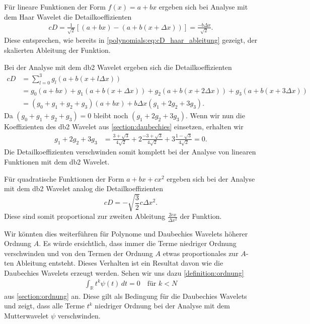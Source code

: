 \begin{refsection}
Für lineare Funktionen der Form $f(x) = a + b x$ ergeben sich bei Analyse mit
dem Haar Wavelet die Detailkoeffizienten
\begin{align*}
    cD = \frac{1}{\sqrt{2}} [ (a + b x) - (a + b (x + \Delta x)) ]
    = \frac{- b \Delta x}{\sqrt{2}}.
\end{align*}
Diese entsprechen, wie bereits in \cref{polynomials:eq:cD_haar_ableitung}
gezeigt, der skalierten Ableitung der Funktion.

Bei der Analyse mit dem db2 Wavelet ergeben sich die Detailkoeffizienten
\begin{align*}
    cD &= \sum_{l=0}^{3} g_l (a + b (x + l\Delta x)) \\
       &= g_0 (a + b x) + g_1 (a + b (x + \Delta x)) + g_2 (a + b (x + 2 \Delta x)) + g_3 (a + b (x + 3 \Delta x)) \\
       &= (g_0 + g_1 + g_2 + g_3) (a + bx) + b \Delta x (g_1 + 2 g_2 + 3 g_3).
\end{align*}
Da $(g_0 + g_1 + g_2 + g_3) = 0$ bleibt noch $(g_1 + 2 g_2 + 3 g_3)$. Wenn wir
nun die Koeffizienten des db2 Wavelet aus \cref{section:daubechies} einsetzen,
erhalten wir
\begin{align*}
    g_1 + 2 g_2 + 3 g_3 &= \frac{3 + \sqrt{3}}{4\sqrt{2}} + 2 \frac{-3 + \sqrt{3}}{4\sqrt{2}} + 3 \frac{1 - \sqrt{3}}{4\sqrt{2}} = 0.
\end{align*}
Die Detailkoeffizienten verschwinden somit komplett bei der Analyse von
linearen Funktionen mit dem db2 Wavelet.

Für quadratische Funktionen der Form $a + bx + cx^2$ ergeben sich bei der
Analyse mit dem db2 Wavelet analog die Detailkoeffizienten \[cD =
-\sqrt{\frac{3}{2}} c \Delta x^2.\] Diese sind somit proportional zur zweiten
Ableitung $\frac{2c x}{\Delta x^2}$ der Funktion.

Wir könnten dies weiterführen für Polynome und Daubechies Wavelets höherer
Ordnung $A$. Es würde ersichtlich, dass immer die Terme niedriger Ordnung
verschwinden und von den Termen der Ordnung $A$ etwas proportionales zur
$A$-ten Ableitung entsteht. Dieses Verhalten ist ein Resultat davon wie die
Daubechies Wavelets erzeugt werden. Sehen wir uns dazu
\cref{definition:ordnung}
\begin{align*}
    \int_{\mathbb R} t^k\psi(t)\,dt=0\quad \text{für $k<N$}
\end{align*}
aus \cref{section:ordnung} an. Diese gilt als Bedingung für die Daubechies
Wavelets und zeigt, dass alle Terme $t^k$ niedriger Ordnung bei der Analyse mit
dem Mutterwavelet $\psi$ verschwinden.


\end{refsection}
